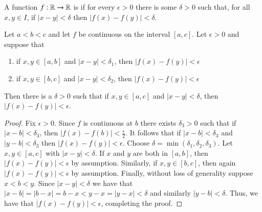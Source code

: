 \begin{defn}
    A function $f:\mathbb R\rightarrow \mathbb R$ is  if for every $\epsilon > 0$ there is some $\delta > 0$ such that, for all $x,y \in I$, if $|x-y| < \delta$ then $|f(x) - f(y)| < \delta$.
\end{defn}


\begin{lem}
    Let $a < b < c$ and let $f$ be continuous on the interval $[a,c]$. Let $\epsilon > 0$ and suppose that \begin{enumerate}
        \item if $x,y \in [a,b]$ and $|x-y| < \delta_1$, then $|f(x) - f(y)| < \epsilon$
        \item if $x,y \in [b,c]$ and $|x-y| < \delta_2$, then $|f(x) - f(y)| < \epsilon$
    \end{enumerate}
    Then there is a $\delta > 0$ such that if $x,y \in [a,c]$ and $|x-y| < \delta$, then $|f(x) - f(y)| < \epsilon$.
\end{lem}
\begin{proof}
    Fix $\epsilon > 0$. Since $f$ is continuous at $b$ there exists $\delta_3 > 0$ such that if $|x-b| < \delta_3$, then $|f(x) - f(b)| < \frac{\epsilon}{2}$. It follows that if $|x-b| < \delta_3$ and $|y-b| < \delta_3$ then $|f(x) - f(y)| < \epsilon$. Choose $\delta = \min(\delta_1,\delta_2,\delta_3)$. Let $x,y \in [a,c]$ with $|x-y| < \delta$. If $x$ and $y$ are both in $[a,b]$, then $|f(x) - f(y)| < \epsilon$ by assumption. Similarly, if $x,y \in [b,c]$, then again $|f(x) - f(y)| < \epsilon$ by assumption. Finally, without loss of generality suppose $x < b < y$. Since $|x-y| < \delta$ we have that $|x-b| = |b-x| = b-x < y-x = |y-x| < \delta$ and similarly $|y-b| < \delta$. Thus, we have that $|f(x) - f(y)| < \epsilon$, completing the proof.
\end{proof}


